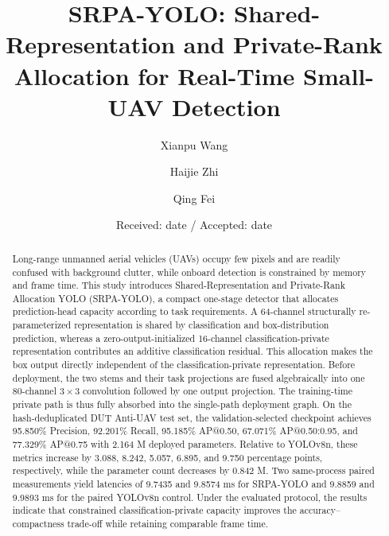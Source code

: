 \documentclass[twocolumn]{svjour3}
\begin{document}
\title{SRPA-YOLO: Shared-Representation and Private-Rank Allocation for Real-Time Small-UAV Detection}

\author{Xianpu Wang \and Haijie Zhi \and Qing Fei}


\date{Received: date / Accepted: date}
\maketitle

\begin{abstract}
Long-range unmanned aerial vehicles (UAVs) occupy few pixels and are readily confused with background clutter, while onboard detection is constrained by memory and frame time. This study introduces Shared-Representation and Private-Rank Allocation YOLO (SRPA-YOLO), a compact one-stage detector that allocates prediction-head capacity according to task requirements. A 64-channel structurally re-parameterized representation is shared by classification and box-distribution prediction, whereas a zero-output-initialized 16-channel classification-private representation contributes an additive classification residual. This allocation makes the box output directly independent of the classification-private representation. Before deployment, the two stems and their task projections are fused algebraically into one 80-channel $3\times3$ convolution followed by one output projection. The training-time private path is thus fully absorbed into the single-path deployment graph. On the hash-deduplicated DUT Anti-UAV test set, the validation-selected checkpoint achieves 95.850\% Precision, 92.201\% Recall, 95.185\% AP@0.50, 67.071\% AP@0.50:0.95, and 77.329\% AP@0.75 with 2.164 M deployed parameters. Relative to YOLOv8n, these metrics increase by 3.088, 8.242, 5.057, 6.895, and 9.750 percentage points, respectively, while the parameter count decreases by 0.842 M. Two same-process paired measurements yield latencies of 9.7435 and 9.8574 ms for SRPA-YOLO and 9.8859 and 9.9893 ms for the paired YOLOv8n control. Under the evaluated protocol, the results indicate that constrained classification-private capacity improves the accuracy--compactness trade-off while retaining comparable frame time.
\end{abstract}










\end{document}
